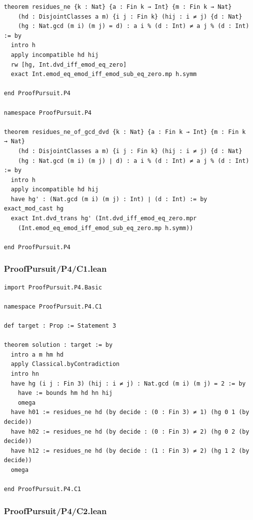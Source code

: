 \documentclass[11pt,a4paper]{article}
\begin{document}
\begin{Verbatim}[breaklines,breakanywhere,fontsize=\footnotesize]
theorem residues_ne {k : Nat} {a : Fin k → Int} {m : Fin k → Nat}
    (hd : DisjointClasses a m) {i j : Fin k} (hij : i ≠ j) {d : Nat}
    (hg : Nat.gcd (m i) (m j) = d) : a i % (d : Int) ≠ a j % (d : Int) := by
  intro h
  apply incompatible hd hij
  rw [hg, Int.dvd_iff_emod_eq_zero]
  exact Int.emod_eq_emod_iff_emod_sub_eq_zero.mp h.symm

end ProofPursuit.P4

namespace ProofPursuit.P4

theorem residues_ne_of_gcd_dvd {k : Nat} {a : Fin k → Int} {m : Fin k → Nat}
    (hd : DisjointClasses a m) {i j : Fin k} (hij : i ≠ j) {d : Nat}
    (hg : Nat.gcd (m i) (m j) ∣ d) : a i % (d : Int) ≠ a j % (d : Int) := by
  intro h
  apply incompatible hd hij
  have hg' : (Nat.gcd (m i) (m j) : Int) ∣ (d : Int) := by exact_mod_cast hg
  exact Int.dvd_trans hg' (Int.dvd_iff_emod_eq_zero.mpr
    (Int.emod_eq_emod_iff_emod_sub_eq_zero.mp h.symm))

end ProofPursuit.P4
\end{Verbatim}

\subsubsection{ProofPursuit/P4/C1.lean}\label{proofpursuitp4c1.lean}

\begin{Verbatim}[breaklines,breakanywhere,fontsize=\footnotesize]
import ProofPursuit.P4.Basic

namespace ProofPursuit.P4.C1

def target : Prop := Statement 3

theorem solution : target := by
  intro a m hm hd
  apply Classical.byContradiction
  intro hn
  have hg (i j : Fin 3) (hij : i ≠ j) : Nat.gcd (m i) (m j) = 2 := by
    have := bounds hm hd hn hij
    omega
  have h01 := residues_ne hd (by decide : (0 : Fin 3) ≠ 1) (hg 0 1 (by decide))
  have h02 := residues_ne hd (by decide : (0 : Fin 3) ≠ 2) (hg 0 2 (by decide))
  have h12 := residues_ne hd (by decide : (1 : Fin 3) ≠ 2) (hg 1 2 (by decide))
  omega

end ProofPursuit.P4.C1
\end{Verbatim}

\subsubsection{ProofPursuit/P4/C2.lean}\label{proofpursuitp4c2.lean}
\end{document}
